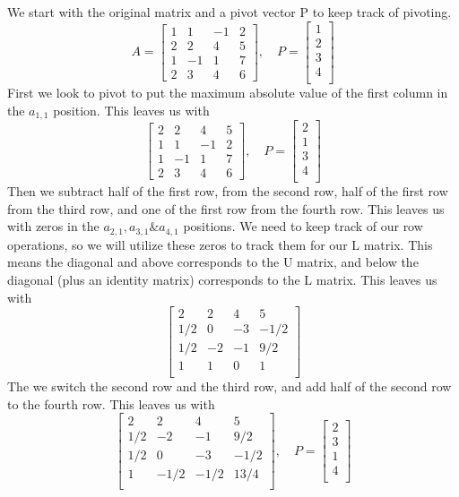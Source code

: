 \documentclass{article}
\begin{document}
\section{}
We start with the original matrix and a pivot vector P to keep track
of pivoting.
\[
A=
\begin{bmatrix}
  1 & 1 &-1 & 2\\
  2 & 2 & 4 & 5\\
  1 &-1 & 1 & 7\\
  2 & 3 & 4 & 6
\end{bmatrix}
, \quad
P=
\begin{bmatrix}
  1\\
  2\\
  3\\
  4\\
\end{bmatrix}
\]
First we look to pivot to put the maximum absolute value of the first
column in the \(a_{1,1}\) position. This leaves us with
\[
\begin{bmatrix}
  2 & 2 & 4 & 5\\
  1 & 1 &-1 & 2\\
  1 &-1 & 1 & 7\\
  2 & 3 & 4 & 6
\end{bmatrix}
, \quad
P=
\begin{bmatrix}
  2\\
  1\\
  3\\
  4\\
\end{bmatrix}
\]
Then we subtract half of the first row, from the second row, half of
the first row from the third row, and one of the first row from the
fourth row. This leaves us with zeros in the
\(a_{2,1},a_{3,1}\&a_{4,1}\) positions. We need to keep track of our
row operations, so we will utilize these zeros to track them for our L
matrix. This means the diagonal and above corresponds to the U matrix,
and below the diagonal (plus an identity matrix) corresponds to the L
matrix.
This leaves us with
\[
\begin{bmatrix}
  2  &  2  &  4  &  5\\
  1/2&  0  & -3  &-1/2\\
  1/2& -2  & -1  & 9/2\\
  1  &  1  &  0  &  1\\
\end{bmatrix}
\]
The we switch the second row and the third row, and add half of the
second row to the fourth row. This leaves us with
\[
\begin{bmatrix}
  2  &  2  &  4  &  5\\
  1/2& -2  & -1  & 9/2\\
  1/2&  0  & -3  &-1/2\\
  1  & -1/2& -1/2&13/4\\
\end{bmatrix}
, \quad
P=
\begin{bmatrix}
  2\\
  3\\
  1\\
  4\\
\end{bmatrix}
\]
\end{document}

